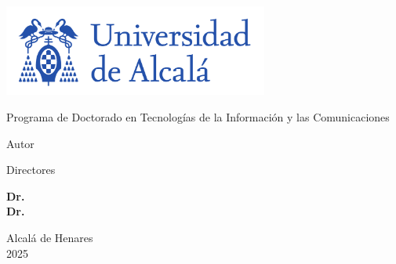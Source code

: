 \thispagestyle{empty}
\large
\begin{center}

  \color{pantone293}

  \centerline{\includegraphics[height=3cm]{include/img/logo_uah_nombre.pdf}}

  \vspace{2cm}

  \huge{Programa de Doctorado en Tecnologías de la Información y las Comunicaciones}

  \vspace{2cm}   
  
  \Huge\textbf{\titulotesis}

  \vspace{10mm}
  
  \huge{{Autor}}\\
  \huge{\textbf{\autortesis}}


  \vspace{10mm}
  
  \huge {Directores}

  \textbf{Dr. \directoruno\\
          Dr. \directordos}


  \color{black}
  

\end{center}

\begin{bottomparagraph}
  \begin{center}

    \color{pantone293}
    \huge {Alcalá de Henares\\2025}
    \color{black}

  \end{center}
\end{bottomparagraph}
